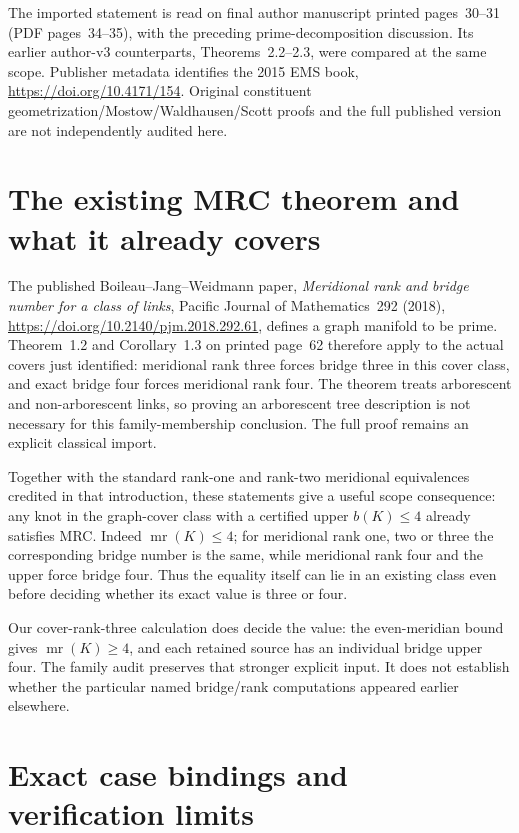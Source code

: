 \documentclass[11pt]{article}
\newcommand{\mr}{\operatorname{mr}}
\begin{document}
The imported statement is read on final author manuscript printed
pages~30--31 (PDF pages~34--35), with the preceding prime-decomposition
discussion. Its earlier author-v3 counterparts, Theorems~2.2--2.3, were
compared at the same scope. Publisher metadata identifies the 2015 EMS
book, \url{https://doi.org/10.4171/154}. Original constituent
geometrization/Mostow/Waldhausen/Scott proofs and the full published
version are not independently audited here.

\section{The existing MRC theorem and what it already covers}

The published Boileau--Jang--Weidmann paper, \emph{Meridional rank and
bridge number for a class of links}, Pacific Journal of Mathematics~292
(2018), \url{https://doi.org/10.2140/pjm.2018.292.61}, defines a graph
manifold to be prime. Theorem~1.2 and Corollary~1.3 on printed page~62
therefore apply to the actual covers just identified: meridional rank
three forces bridge three in this cover class, and exact bridge four
forces meridional rank four. The theorem treats arborescent and
non-arborescent links, so proving an arborescent tree description is not
necessary for this family-membership conclusion. The full proof remains
an explicit classical import.

Together with the standard rank-one and rank-two meridional equivalences
credited in that introduction, these statements give a useful scope
consequence: any knot in the graph-cover class with a certified upper
$b(K)\le4$ already satisfies MRC. Indeed $\mr(K)\le4$; for meridional
rank one, two or three the corresponding bridge number is the same,
while meridional rank four and the upper force bridge four. Thus the
equality itself can lie in an existing class even before deciding
whether its exact value is three or four.

Our cover-rank-three calculation does decide the value: the
even-meridian bound gives $\mr(K)\ge4$, and each retained source has an
individual bridge upper four. The family audit preserves that stronger
explicit input. It does not establish whether the particular named
bridge/rank computations appeared earlier elsewhere.

\section{Exact case bindings and verification limits}
\end{document}
